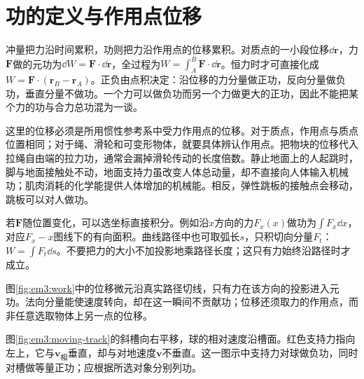 \section{功的定义与作用点位移}

冲量把力沿时间累积，功则把力沿作用点的位移累积。对质点的一小段位移$\dd\bm r$，力$\bm F$做的元功为$\dd W=\bm F\cdot\dd\bm r$，全过程为$W=\int_A^B\bm F\cdot\dd\bm r$。恒力时才可直接化成$W=\bm F\cdot(\bm r_B-\bm r_A)$。正负由点积决定：沿位移的力分量做正功，反向分量做负功，垂直分量不做功。一个力可以做负功而另一个力做更大的正功，因此不能把某个力的功与合力总功混为一谈。

这里的位移必须是所用惯性参考系中受力作用点的位移。对于质点，作用点与质点位置相同；对于绳、滑轮和可变形物体，就要具体辨认作用点。把物块的位移代入拉绳自由端的拉力功，通常会漏掉滑轮传动的长度倍数。静止地面上的人起跳时，脚与地面接触处不动，地面支持力虽改变人体总动量，却不直接向人体输入机械功；肌肉消耗的化学能提供人体增加的机械能。相反，弹性跳板的接触点会移动，跳板可以对人做功。

若$\bm F$随位置变化，可以选坐标直接积分。例如沿$x$方向的力$F_x(x)$做功为$\int F_x\dd x$，对应$F_x-x$图线下的有向面积。曲线路径中也可取弧长$s$，只积切向分量$F_t$：$W=\int F_t\dd s$。不要把力的大小不加投影地乘路径长度；这只有力始终沿路径时才成立。


图\ref{fig:em3:work}中的位移微元沿真实路径切线，只有力在该方向的投影进入元功。法向分量能使速度转向，却在这一瞬间不贡献功；位移还须取力的作用点，而非任意选取物体上另一点的位移。


图\ref{fig:em3:moving-track}的斜槽向右平移，球的相对速度沿槽面。红色支持力指向左上，它与$\bm v_{\text{相}}$垂直，却与对地速度$\bm v$不垂直。这一图示中支持力对球做负功，同时对槽做等量正功；应根据所选对象分别列功。


